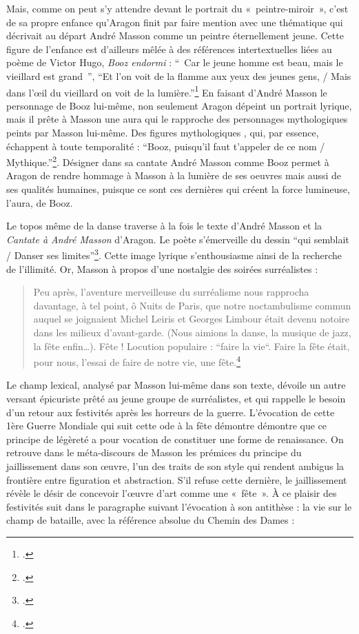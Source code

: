 	 Mais, comme on peut s’y attendre devant le portrait du « peintre-miroir », c’est de sa propre enfance qu’Aragon finit par faire mention avec une thématique qui décrivait au départ André Masson comme un peintre éternellement jeune. Cette figure de l’enfance est d’ailleurs mêlée à des références intertextuelles liées au  poème de Victor Hugo, \emph{Booz endormi }: \enquote{ Car le jeune homme est beau, mais le vieillard est grand }, \enquote{Et l'on voit de la flamme aux yeux des jeunes gens, / Mais dans l’\oe{}il du vieillard on voit de la lumière.}\footcite{hugo} En faisant d’André Masson le personnage de Booz lui-même, non seulement Aragon dépeint un portrait lyrique, mais il prête à Masson une aura qui le rapproche des personnages mythologiques peints par Masson lui-même. Des figures mythologiques , qui, par essence, échappent à toute temporalité :  \enquote{Booz, puisqu'il faut t’appeler de ce nom / Mythique.}\footcite[p685]{ecritssurla}. Désigner dans sa cantate André Masson comme Booz permet à Aragon de rendre hommage à Masson à la lumière de ses oeuvres mais aussi de ses qualités humaines, puisque ce sont ces dernières qui créent la force lumineuse, l’aura, de Booz. 

	Le topos même de la danse traverse à la fois le texte d’André Masson et la \emph{Cantate à André Masson }d’Aragon. Le poète s'émerveille du dessin \enquote{qui semblait / Danser ses limites}\footcite[p682]{ecritssurla}. Cette image lyrique s'enthousiasme ainsi de la recherche de l'illimité. Or, Masson à propos d’une nostalgie des soirées surréalistes : 
\begin{quote}
 Peu après, l’aventure merveilleuse du surréalisme nous rapprocha davantage, à tel point, ô Nuits de Paris, que notre noctambulisme commun auquel se joignaient Michel Leiris et Georges Limbour était devenu notoire dans les milieux d’avant-garde. (Nous aimions la danse, la musique de jazz, la fête enfin…). Fête ! Locution populaire : “faire la vie“. Faire la fête était, pour nous, l’essai de faire de notre vie, une fête.\footcite[p682]{ecritssurla}\end{quote}	

	Le champ lexical, analysé par Masson lui-même dans son texte, dévoile un autre versant épicuriste prêté au jeune groupe de surréalistes, et qui rappelle le besoin d’un retour aux festivités après les horreurs de la guerre. L’évocation de cette 1ère Guerre Mondiale qui suit cette ode à la fête démontre démontre que ce principe de légèreté a pour vocation de constituer une forme de renaissance. On retrouve dans le méta-discours de Masson les prémices du principe du jaillissement dans son \oe{}uvre, l’un des traits de son style qui rendent ambigus la frontière entre figuration et abstraction. S’il refuse cette dernière, le jaillissement révèle le désir de concevoir l’\oe{}uvre d’art comme une « fête ». À ce plaisir des festivités suit dans le paragraphe suivant l’évocation à son antithèse : la vie sur le champ de bataille, avec la référence absolue du Chemin des Dames : 

